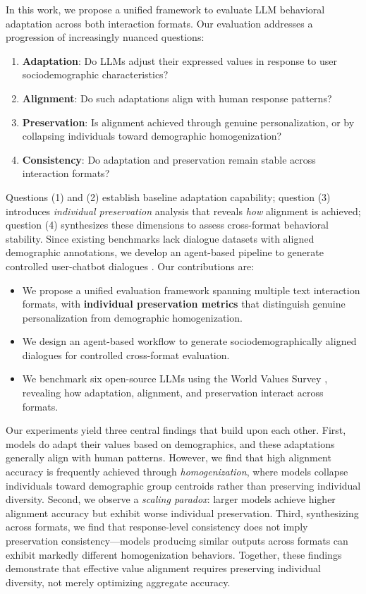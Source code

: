 \documentclass[acmlarge]{acmart}
\begin{document}
In this work, we propose a unified framework to evaluate LLM behavioral adaptation across both interaction formats. Our evaluation addresses a progression of increasingly nuanced questions:
\begin{enumerate}
    \item \textbf{Adaptation}: Do LLMs adjust their expressed values in response to user sociodemographic characteristics?
    \item \textbf{Alignment}: Do such adaptations align with human response patterns?
    \item \textbf{Preservation}: Is alignment achieved through genuine personalization, or by collapsing individuals toward demographic homogenization?
    \item \textbf{Consistency}: Do adaptation and preservation remain stable across interaction formats?
\end{enumerate}

Questions (1) and (2) establish baseline adaptation capability; question (3) introduces \textit{individual preservation} analysis that reveals \textit{how} alignment is achieved; question (4) synthesizes these dimensions to assess cross-format behavioral stability. Since existing benchmarks lack dialogue datasets with aligned demographic annotations, we develop an agent-based pipeline to generate controlled user-chatbot dialogues \citep{dam2024completesurveyllmbasedai}. Our contributions are:

\begin{itemize}
    \item We propose a unified evaluation framework spanning multiple text interaction formats, with \textbf{individual preservation metrics} that distinguish genuine personalization from demographic homogenization.
    \item We design an agent-based workflow to generate sociodemographically aligned dialogues for controlled cross-format evaluation.
    \item We benchmark six open-source LLMs using the World Values Survey \citep{Haerpfer2020-qe}, revealing how adaptation, alignment, and preservation interact across formats.
\end{itemize}

Our experiments yield three central findings that build upon each other. First, models do adapt their values based on demographics, and these adaptations generally align with human patterns. However, we find that high alignment accuracy is frequently achieved through \textit{homogenization}, where models collapse individuals toward demographic group centroids rather than preserving individual diversity. Second, we observe a \textit{scaling paradox}: larger models achieve higher alignment accuracy but exhibit worse individual preservation. Third, synthesizing across formats, we find that response-level consistency does not imply preservation consistency---models producing similar outputs across formats can exhibit markedly different homogenization behaviors. Together, these findings demonstrate that effective value alignment requires preserving individual diversity, not merely optimizing aggregate accuracy.
\end{document}
